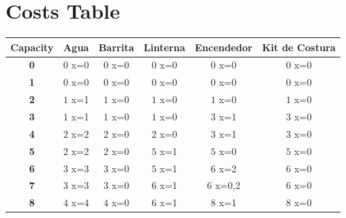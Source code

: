 \documentclass{article}
\begin{document}
\section{Costs Table}
\begin{center}
    \begin{tabular}{|c||c|c|c|c|c|}
        \hline
        \textbf{Capacity} & \textbf{Agua} & \textbf{Barrita} & \textbf{Linterna} & \textbf{Encendedor} & \textbf{Kit de Costura} \\
        \hline
        \hline
        \textbf{0}& \cellcolor[HTML]{FC3F3F}$0$ x={0}& \cellcolor[HTML]{FC3F3F}$0$ x={0}& \cellcolor[HTML]{FC3F3F}$0$ x={0}& \cellcolor[HTML]{FC3F3F}$0$ x={0}& \cellcolor[HTML]{FC3F3F}$0$ x={0}\\
        \hline
        \textbf{1}& \cellcolor[HTML]{FC3F3F}$0$ x={0}& \cellcolor[HTML]{FC3F3F}$0$ x={0}& \cellcolor[HTML]{FC3F3F}$0$ x={0}& \cellcolor[HTML]{FC3F3F}$0$ x={0}& \cellcolor[HTML]{FC3F3F}$0$ x={0}\\
        \hline
        \textbf{2}& \cellcolor[HTML]{3FFC45}$1$ x={1} & \cellcolor[HTML]{FC3F3F}$1$ x={0}& \cellcolor[HTML]{FC3F3F}$1$ x={0}& \cellcolor[HTML]{FC3F3F}$1$ x={0}& \cellcolor[HTML]{FC3F3F}$1$ x={0}\\
        \hline
        \textbf{3}& \cellcolor[HTML]{3FFC45}$1$ x={1} & \cellcolor[HTML]{FC3F3F}$1$ x={0}& \cellcolor[HTML]{FC3F3F}$1$ x={0}& \cellcolor[HTML]{3FFC45}$3$ x={1} & \cellcolor[HTML]{FC3F3F}$3$ x={0}\\
        \hline
        \textbf{4}& \cellcolor[HTML]{3FFC45}$2$ x={2} & \cellcolor[HTML]{FC3F3F}$2$ x={0}& \cellcolor[HTML]{FC3F3F}$2$ x={0}& \cellcolor[HTML]{3FFC45}$3$ x={1} & \cellcolor[HTML]{FC3F3F}$3$ x={0}\\
        \hline
        \textbf{5}& \cellcolor[HTML]{3FFC45}$2$ x={2} & \cellcolor[HTML]{FC3F3F}$2$ x={0}& \cellcolor[HTML]{3FFC45}$5$ x={1} & \cellcolor[HTML]{FC3F3F}$5$ x={0}& \cellcolor[HTML]{FC3F3F}$5$ x={0}\\
        \hline
        \textbf{6}& \cellcolor[HTML]{3FFC45}$3$ x={3} & \cellcolor[HTML]{FC3F3F}$3$ x={0}& \cellcolor[HTML]{3FFC45}$5$ x={1} & \cellcolor[HTML]{3FFC45}$6$ x={2} & \cellcolor[HTML]{FC3F3F}$6$ x={0}\\
        \hline
        \textbf{7}& \cellcolor[HTML]{3FFC45}$3$ x={3} & \cellcolor[HTML]{FC3F3F}$3$ x={0}& \cellcolor[HTML]{3FFC45}$6$ x={1} & \cellcolor[HTML]{3F62FC}$6$ x={0,2}& \cellcolor[HTML]{FC3F3F}$6$ x={0}\\
        \hline
        \textbf{8}& \cellcolor[HTML]{3FFC45}$4$ x={4} & \cellcolor[HTML]{FC3F3F}$4$ x={0}& \cellcolor[HTML]{3FFC45}$6$ x={1} & \cellcolor[HTML]{3FFC45}$8$ x={1} & \cellcolor[HTML]{FC3F3F}$8$ x={0}\\

\end{tabular}
\end{center}
\end{document}
